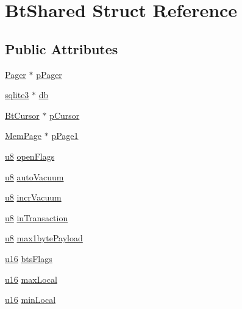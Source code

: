 \hypertarget{struct_bt_shared}{\section{Bt\-Shared Struct Reference}
\label{struct_bt_shared}
}
\subsection*{Public Attributes}
\begin{DoxyCompactItemize}
\item 
\hyperlink{struct_pager}{Pager} $\ast$ \hyperlink{struct_bt_shared_ab79703fc47a16446274457588d7eb989}{p\-Pager}
\item 
\hyperlink{structsqlite3}{sqlite3} $\ast$ \hyperlink{struct_bt_shared_a93dafa672793f6117a336d5987951c8e}{db}
\item 
\hyperlink{struct_bt_cursor}{Bt\-Cursor} $\ast$ \hyperlink{struct_bt_shared_a8f8b52dee390e5606e8e2a8511530de7}{p\-Cursor}
\item 
\hyperlink{struct_mem_page}{Mem\-Page} $\ast$ \hyperlink{struct_bt_shared_a296dffd1c698ec175fee109718f32d5d}{p\-Page1}
\item 
\hyperlink{sqlite3_8c_a74a0f6424ae628af25f23f0a35f6ead3}{u8} \hyperlink{struct_bt_shared_a8fbc250e23d7c417ccfec8cceb08329d}{open\-Flags}
\item 
\hyperlink{sqlite3_8c_a74a0f6424ae628af25f23f0a35f6ead3}{u8} \hyperlink{struct_bt_shared_a770c4f6244d4350f27029cb909902a61}{auto\-Vacuum}
\item 
\hyperlink{sqlite3_8c_a74a0f6424ae628af25f23f0a35f6ead3}{u8} \hyperlink{struct_bt_shared_a8d8ba06335a63d8a36294a0f1ae8377a}{incr\-Vacuum}
\item 
\hyperlink{sqlite3_8c_a74a0f6424ae628af25f23f0a35f6ead3}{u8} \hyperlink{struct_bt_shared_aeaa6c0f33b83434ecee4bd8c4c8df48e}{in\-Transaction}
\item 
\hyperlink{sqlite3_8c_a74a0f6424ae628af25f23f0a35f6ead3}{u8} \hyperlink{struct_bt_shared_ae0a261001a5237cd705fa16f0d00ad16}{max1byte\-Payload}
\item 
\hyperlink{sqlite3_8c_a20f2299e322dcbde37cb07b16910b843}{u16} \hyperlink{struct_bt_shared_a287b7749063c63e45518f72d6f9b3c1d}{bts\-Flags}
\item 
\hyperlink{sqlite3_8c_a20f2299e322dcbde37cb07b16910b843}{u16} \hyperlink{struct_bt_shared_a2937d14071841fe0ecae3ce1eb1da96c}{max\-Local}
\item 
\hyperlink{sqlite3_8c_a20f2299e322dcbde37cb07b16910b843}{u16} \hyperlink{struct_bt_shared_affb40500b5c63601ef3ca3600983b12c}{min\-Local}

\end{DoxyCompactItemize}
